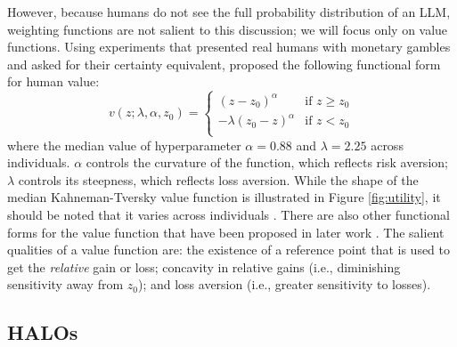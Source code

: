 However, because humans do not see the full probability distribution of an LLM, weighting functions are not salient to this discussion; we will focus only on value functions.
Using experiments that presented real humans with monetary gambles and asked for their certainty equivalent, \citet{tversky1992advances} proposed the following functional form for human value:
\begin{equation}
    v(z; \lambda, \alpha,  z_0) = \begin{cases}
(z - z_0)^\alpha & \text{if } z \geq z_0\\
-\lambda(z_0 - z)^\alpha & \text{if } z < z_0 \\
    \end{cases}
    \label{eq:human_value}
\end{equation}
where the median value of hyperparameter $\alpha = 0.88$ and $\lambda = 2.25$ across individuals.
$\alpha$ controls the curvature of the function, which reflects risk aversion; $\lambda$ controls its steepness, which reflects loss aversion.
While the shape of the median Kahneman-Tversky value function is illustrated in Figure \ref{fig:utility}, it should be noted that it varies across individuals \citep{tversky1992advances}.
There are also other functional forms for the value function that have been proposed in later work \citep{gurevich2009decision}. 
The salient qualities of a value function are: the existence of a reference point that is used to get the \emph{relative} gain or loss; concavity in relative gains (i.e., diminishing sensitivity away from $z_0$); and loss aversion (i.e., greater sensitivity to losses).

\subsection{HALOs}
\label{ssec:halos}


